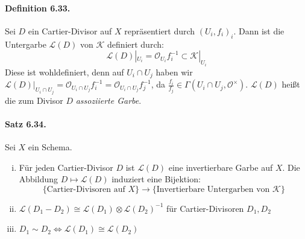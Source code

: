 \paragraph{Definition 6.33.}\label{6.33} Sei $D$ ein Cartier-Divisor auf $X$ repräsentiert durch $(U_i,f_i)_i$. Dann ist die Untergarbe $\mathcal{L}(D)$ von $\mathcal{K}$ definiert durch:
\[\mathcal{L}(D)|_{U_i}=\mathcal{O}_{U_i}f_i^{-1}\subset\mathcal{K}|_{U_i} \]
Diese ist wohldefiniert, denn auf $U_i\cap U_j$ haben wir $\mathcal{L}(D)|_{U_i\cap U_j}=\mathcal{O}_{U_i\cap U_j}f_i^{-1}=\mathcal{O}_{U_i\cap U_j}f_j^{-1}$, da $\frac{f_i}{f_j}\in\Gamma(U_i\cap U_j,\mathcal{O}^\times)$. $\mathcal{L}(D)$ heißt die zum Divisor $D$ \textit{assoziierte Garbe}.

\paragraph{Satz 6.34.}\label{6.34} Sei $X$ ein Schema.
\begin{enumerate}[(i)]
\item Für jeden Cartier-Divisor $D$ ist $\mathcal{L}(D)$ eine invertierbare Garbe auf $X$. Die Abbildung $D\mapsto\mathcal{L}(D)$ induziert eine Bijektion:
\[\{\text{Cartier-Divisoren auf }X \}\to\{\text{Invertierbare Untergarben von }\mathcal{K} \} \]
\item $\mathcal{L}(D_1-D_2)\cong\mathcal{L}(D_1)\otimes\mathcal{L}(D_2)^{-1}$ für Cartier-Divisoren $D_1,D_2$
\item $D_1\sim D_2\iff\mathcal{L}(D_1)\cong\mathcal{L}(D_2)$
\end{enumerate}

